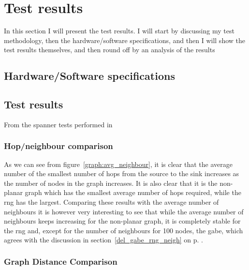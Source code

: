 \section{Test results}
\label{section:test_results}
In this section I will present the test results. I will start by discussing my test methodology, then the hardware/software specifications, and then I will show the test results themselves, and then round off by an analysis of the results 

\subsection{Hardware/Software specifications}

\subsection{Test results}
From the spanner tests performed in 

\subsubsection{Hop/neighbour comparison}
\label{section:hop_neighbour_comparison}

As we can see from figure~\ref{graph:avg_neighbour}, it is clear that the average number of the smallest number of hops from the source to the sink increases as the number of nodes in the graph increases. It is also clear that it is the non-planar graph which has the smallest average number of hops required, while the \ac{rng} has the largest. Comparing these results with the average number of neighbours it is however very interesting to see that while the average number of neighbours keeps increasing for the non-planar graph, it is completely stable for the \ac{rng} and, except for the number of neighbours for 100 nodes, the \ac{gabe}, which agrees with the discussion in section~\ref{del_gabe_rng_neigh} on p. \pageref{del_gabe_rng_neigh}. 

\subsubsection{Graph Distance Comparison}
\label{section:graph_distance_comparison}

